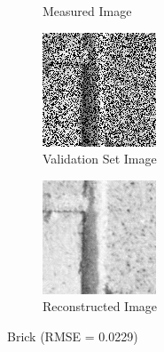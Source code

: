 \documentclass[a4paper]{article}
\begin{document}
\begin{figure}[H]
\begin{subfigure}{0.23\linewidth}
		\caption{Measured Image}
	\end{subfigure}
	\begin{subfigure}{0.23\linewidth}
		\centering
		\includegraphics[width=\linewidth]{../media/Q3 texture_brick validation.png}
		\caption{Validation Set Image}
	\end{subfigure}
	\begin{subfigure}{0.23\linewidth}
		\centering
		\includegraphics[width=\linewidth]{../media/Q3 texture_brick reconstructed.png}
		\caption{Reconstructed Image}
	\end{subfigure}
	\caption{Brick (RMSE = 0.0229)}
\end{figure}
\end{document}
